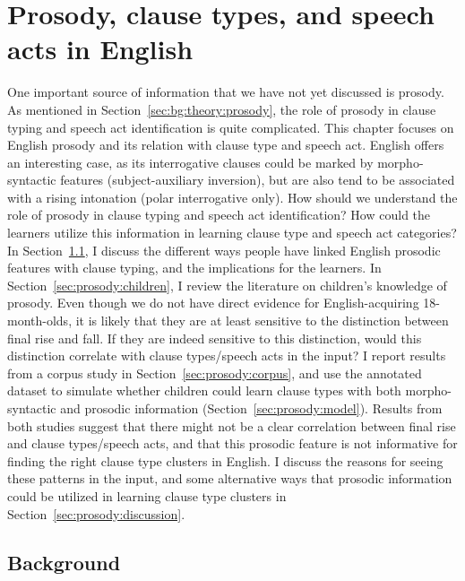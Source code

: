 
\chapter{Prosody, clause types, and speech acts in English}
\label{chap:prosody}
One important source of information that we have not yet discussed is prosody. As mentioned in Section~\ref{sec:bg:theory:prosody}, the role of prosody in clause typing and speech act identification is quite complicated. This chapter focuses on English prosody and its relation with clause type and speech act. English offers an interesting case, as its interrogative clauses could be marked by morpho-syntactic features (subject-auxiliary inversion), but are also tend to be associated with a rising intonation (polar interrogative only). How should we understand the role of prosody in clause typing and speech act identification? How could the learners utilize this information in learning clause type and speech act categories? In Section~\ref{sec:prosody:bg}, I discuss the different ways people have linked English prosodic features with clause typing, and the implications for the learners. In Section~\ref{sec:prosody:children}, I review the literature on children's knowledge of prosody. Even though we do not have direct evidence for English-acquiring 18-month-olds, it is likely that they are at least sensitive to the distinction between final rise and fall. If they are indeed sensitive to this distinction, would this distinction correlate with clause types/speech acts in the input? I report results from a corpus study in Section~\ref{sec:prosody:corpus}, and use the annotated dataset to simulate whether children could learn clause types with both morpho-syntactic and prosodic information (Section~\ref{sec:prosody:model}). Results from both studies suggest that there might not be a clear correlation between final rise and clause types/speech acts, and that this prosodic feature is not informative for finding the right clause type clusters in English. I discuss the reasons for seeing these patterns in the input, and some alternative ways that prosodic information could be utilized in learning clause type clusters in Section~\ref{sec:prosody:discussion}.


\section{Background}
\label{sec:prosody:bg}
